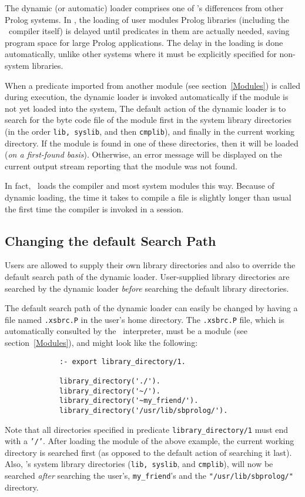 The dynamic (or automatic) loader comprises one of \ourprolog's 
differences from other Prolog systems.
In \ourprolog, the loading of user modules Prolog libraries (including
the \ourprolog\ compiler itself) is delayed until predicates in them
are actually needed, saving program space for large Prolog
applications.  The delay in the loading is done automatically, unlike
other systems where it must be explicitly specified for non-system
libraries.

When a predicate imported from another module (see section~\ref{Modules})
is called during execution, the dynamic loader is invoked automatically
if the module is not yet loaded into the system, 
The default action of the dynamic loader is to search for the
byte code file of the module 
first in the system library directories (in the order {\tt lib, syslib}, 
and then {\tt cmplib}), and finally in the current working directory.
If the module is found in one of these directories, then it will 
be loaded ({\em on a first-found basis}). Otherwise, an error 
message will be displayed on the current output stream
reporting that the module was not found.

In fact, \ourprolog\ loads the compiler and most system modules this way.
Because of dynamic loading, the time it takes to compile a file 
is slightly longer than usual the first time the compiler is 
invoked in a session.


\subsection{Changing the default Search Path}
Users are allowed to supply their own library directories and also to
override the default search path of the dynamic loader. 
User-supplied library directories are searched by the dynamic loader 
{\em before} searching the default library directories.

The default search path of the dynamic loader can easily be changed
by having a file named {\verb|.xsbrc.P|} in the user's home directory.  
The {\verb|.xsbrc.P|} file, which is automatically consulted by the
 \ourprolog\ interpreter, must be a module (see section~\ref{Modules}),
and might look like the following:
\begin{verbatim}
             :- export library_directory/1.

             library_directory('./').
             library_directory('~/').
             library_directory('~my_friend/').
             library_directory('/usr/lib/sbprolog/').
\end{verbatim}
Note that all directories specified in predicate {\tt library\_directory/1}
must end with a {\tt '/'}.  After loading the module of the above 
example, the current working directory is searched first (as opposed to the
default action of searching it last).  Also, \ourprolog's system
library directories ({\tt lib, syslib}, and {\tt cmplib}), will now
be searched {\em after} searching the user's, {\tt my\_friend}'s 
and the {\tt "/usr/lib/sbprolog/"} directory.

